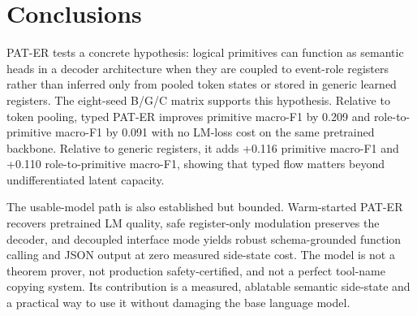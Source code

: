 \section{Conclusions}
\label{sec:conclusions}

PAT-ER tests a concrete hypothesis: logical primitives can function as semantic
heads in a decoder architecture when they are coupled to event-role registers
rather than inferred only from pooled token states or stored in generic learned
registers. The eight-seed B/G/C matrix supports this hypothesis. Relative to
token pooling, typed PAT-ER improves primitive macro-F1 by 0.209 and
role-to-primitive macro-F1 by 0.091 with no LM-loss cost on the same pretrained
backbone. Relative to generic registers, it adds +0.116 primitive macro-F1 and
+0.110 role-to-primitive macro-F1, showing that typed flow matters beyond
undifferentiated latent capacity.

The usable-model path is also established but bounded. Warm-started PAT-ER
recovers pretrained LM quality, safe register-only modulation preserves the
decoder, and decoupled interface mode yields robust schema-grounded function
calling and JSON output at zero measured side-state cost. The model is not a
theorem prover, not production safety-certified, and not a perfect tool-name
copying system. Its contribution is a measured, ablatable semantic side-state
and a practical way to use it without damaging the base language model.
